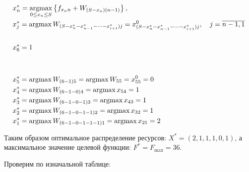 \begin{align*}
     & x_n^* = \operatorname*{argmax}\limits_{0 \leq x_n \leq S} \left\{f_{x_nn} + W_{(S-x_n)(n-1)}\right\},                                                           \\
     & x_j^* = \operatorname*{argmax} W_{(S - x_n^* - x_{n-1}^* - \dots - x_{i+1}^*)j} = x_{(S - x_n^* - x_{n-1}^* - \dots - x_{i+1}^*)j}^0, \quad j=\overline{n-1, 1} \\                                                                                                                                                                                                                       \\
     & x_6^* = 1                                                                                                                                        \\                                                                                                                                                                                                                \\                                                                                                                                                                           \\
     & x_5^* = \operatorname*{argmax} W_{(6 - 1)5} = \operatorname*{argmax} W_{55} = x_{55}^0 = 0                                                                                     \\
     & x_4^* = \operatorname*{argmax} W_{(6 - 1 - 0)4} = \operatorname*{argmax} x_{54} = 1                                                                                            \\
     & x_3^* = \operatorname*{argmax} W_{(6 - 1 - 0 - 1)3} = \operatorname*{argmax} x_{43} = 1                                                                                        \\
     & x_2^* = \operatorname*{argmax} W_{(6 - 1 - 0 - 1 - 1)2} = \operatorname*{argmax} x_{32} = 1                                                                                    \\
     & x_1^* = \operatorname*{argmax} W_{(6 - 1 - 0 - 1 - 1 - 1)1} = \operatorname*{argmax} x_{21} = 2
\end{align*}

Таким образом оптимальное распределение ресурсов: $X^* = (2, 1, 1, 1, 0, 1)$, а максимальное значение целевой функции: $F^* = F_{\max} = 36$.

Проверим по изначальной таблице:

